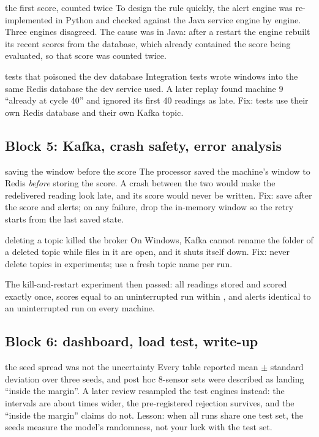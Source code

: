 \documentclass[11pt,a4paper]{article}
\begin{document}
\begin{mistake}{the first score, counted twice}
To design the rule quickly, the alert engine was re-implemented in Python and checked against the Java service
engine by engine. Three engines disagreed. The cause was in Java: after a restart the engine rebuilt its recent
scores from the database, which already contained the score being evaluated, so that score was counted twice.
\end{mistake}

\begin{mistake}{tests that poisoned the dev database}
Integration tests wrote windows into the same Redis database the dev service used. A later replay found machine
9 ``already at cycle 40'' and ignored its first 40 readings as late. Fix: tests use their own Redis database and
their own Kafka topic.
\end{mistake}

\subsection{Block 5: Kafka, crash safety, error analysis}
\begin{mistake}{saving the window before the score}
The processor saved the machine's window to Redis \emph{before} storing the score. A crash between the two would
make the redelivered reading look late, and its score would never be written. Fix: save after the score and
alerts; on any failure, drop the in-memory window so the retry starts from the last saved state.
\end{mistake}

\begin{mistake}{deleting a topic killed the broker}
On Windows, Kafka cannot rename the folder of a deleted topic while files in it are open, and it shuts itself
down. Fix: never delete topics in experiments; use a fresh topic name per run.
\end{mistake}

The kill-and-restart experiment then passed: all \RestartFileRows{} readings stored and scored exactly once, scores
equal to an uninterrupted run within \RestartMaxDiff{}, and alerts identical to an uninterrupted run on every
machine.

\subsection{Block 6: dashboard, load test, write-up}

\begin{mistake}{the seed spread was not the uncertainty}
Every table reported mean $\pm$ standard deviation over three seeds, and post hoc 8-sensor sets were described as
landing ``inside the margin''. A later review resampled the \SplitTest{} test engines instead: the intervals are about
\BootCiOverSeed{} times wider, the pre-registered rejection survives, and the ``inside the margin'' claims do not.
Lesson: when all runs share one test set, the seeds measure the model's randomness, not your luck with the test set.
\end{mistake}
\end{document}
